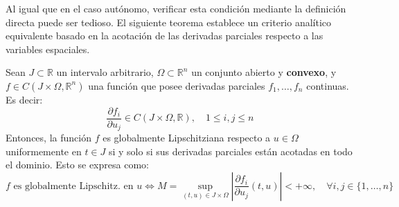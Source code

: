 Al igual que en el caso autónomo, verificar esta condición mediante la definición directa puede ser tedioso. El siguiente teorema establece un criterio analítico equivalente basado en la acotación de las derivadas parciales respecto a las variables espaciales.

\begin{teorema}
    Sean $J \subset \mathbb{R}$ un intervalo arbitrario, $\Omega \subset \mathbb{R}^n$ un conjunto abierto y \textbf{convexo}, y $f \in C (J \times \Omega, \mathbb{R}^n)$ una función que posee derivadas parciales $f_1, \ldots, f_n$ continuas. Es decir:
    \[
        \frac{\partial f_i}{\partial u_j} \in C(J \times \Omega, \mathbb{R}), \quad 1 \leq i,j \leq n
    \]
    Entonces, la función $f$ es globalmente Lipschitziana respecto a $u \in \Omega$ uniformemente en $t \in J$ si y solo si sus derivadas parciales están acotadas en todo el dominio. Esto se expresa como:
    \[
        f \text{ es globalmente Lipschitz. en } u 
        \iff
        M = \sup_{(t,u) \in J \times \Omega} \left| \frac{\partial f_i}{\partial u_j}(t,u) \right| < +\infty, \quad \forall i,j \in \{1, \ldots, n\}
    \]
\end{teorema}


